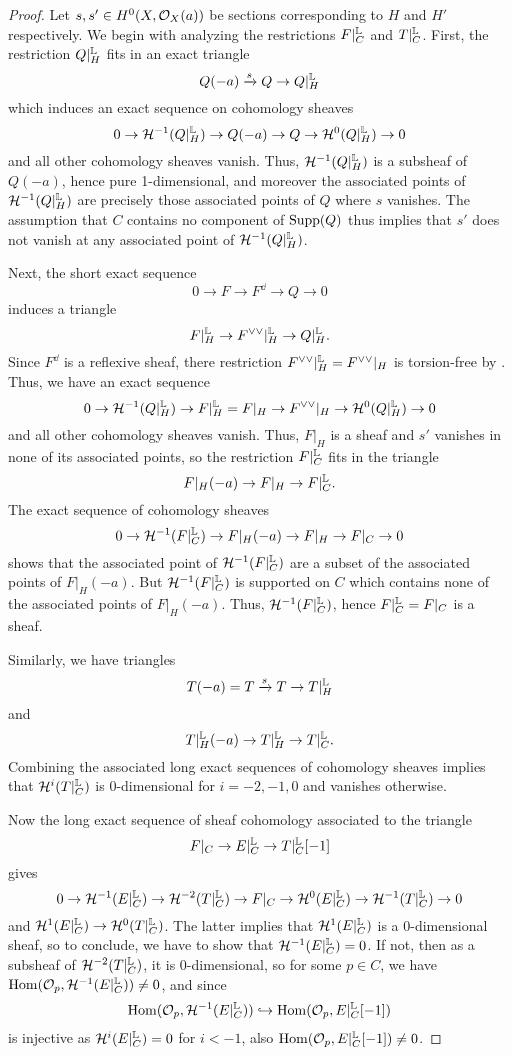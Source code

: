 \begin{proof}
Let $s, s' \in H^0(X, \mathcal{O}_X(a))$ be sections corresponding to $H$ and $H'$ respectively. We begin with analyzing the restrictions $F|^{\mathbb{L}}_C$ and $T|^{\mathbb{L}}_C$. First, the restriction $Q|^{\mathbb{L}}_H$ fits in an exact triangle
\[ Q(-a) \xrightarrow{s} Q \to Q|^{\mathbb{L}}_H \]
which induces an exact sequence on cohomology sheaves
\[ 0 \to \mathcal{H}^{-1}(Q|^{\mathbb{L}}_H) \to Q(-a) \to Q \to \mathcal{H}^0(Q|^{\mathbb{L}}_H) \to 0 \]
and all other cohomology sheaves vanish. Thus, $\mathcal{H}^{-1}(Q|^{\mathbb{L}}_H)$ is a subsheaf of $Q(-a)$, hence pure 1-dimensional, and moreover the associated points of $\mathcal{H}^{-1}(Q|^{\mathbb{L}}_H)$ are precisely those associated points of $Q$ where $s$ vanishes. The assumption that $C$ contains no component of $\operatorname{\mathrm{Supp}}(Q)$ thus implies that $s'$ does not vanish at any associated point of $\mathcal{H}^{-1}(Q|^{\mathbb{L}}_H)$.

Next, the short exact sequence
\[ 0 \to F \to F^\dd \to Q \to 0 \]
induces a triangle
\[ F|^{\mathbb{L}}_H \to F^{\vee\vee}|^{\mathbb{L}}_H \to Q|^{\mathbb{L}}_H. \]
Since $F^\dd$ is a reflexive sheaf, there restriction $F^{\vee\vee}|^{\mathbb{L}}_H = F^{\vee\vee}|_H$ is torsion-free by \cite[Corollary 1.1.14]{HL}. Thus, we have an exact sequence
\[ 0 \to \mathcal{H}^{-1}(Q|^{\mathbb{L}}_H) \to F|^{\mathbb{L}}_H = F|_H \to F^{\vee\vee}|_H \to \mathcal{H}^0(Q|^{\mathbb{L}}_H) \to 0 \]
and all other cohomology sheaves vanish. Thus, $F|_H$ is a sheaf and $s'$ vanishes in none of its associated points, so the restriction $F|^{\mathbb{L}}_C$ fits in the triangle
\[ F|_H(-a) \to F|_H \to F|^{\mathbb{L}}_C. \]
The exact sequence of cohomology sheaves
\[ 0 \to \mathcal{H}^{-1}(F|^{\mathbb{L}}_C) \to F|_H(-a) \to F|_H \to F|_C \to 0 \]
shows that the associated point of $\mathcal{H}^{-1}(F|^{\mathbb{L}}_C)$ are a subset of the associated points of $F|_H(-a)$. But $\mathcal{H}^{-1}(F|^{\mathbb{L}}_C)$ is supported on $C$ which contains none of the associated points of $F|_H(-a)$. Thus, $\mathcal{H}^{-1}(F|^{\mathbb{L}}_C)$, hence $F|^{\mathbb{L}}_C = F|_C$ is a sheaf.

Similarly, we have triangles
\[ T(-a) = T \xrightarrow{s} T \to T|^{\mathbb{L}}_H \]
and
\[ T|^{\mathbb{L}}_H(-a) \to T|^{\mathbb{L}}_H \to T|^{\mathbb{L}}_C. \]
Combining the associated long exact sequences of cohomology sheaves implies that $\mathcal{H}^i(T|^{\mathbb{L}}_C)$ is 0-dimensional for $i = -2, -1, 0$ and vanishes otherwise.

Now the long exact sequence of sheaf cohomology associated to the triangle
\[ F|_C \to E|^{\mathbb{L}}_C \to T|^{\mathbb{L}}_C[-1] \]
gives
\[ 0 \to \mathcal{H}^{-1}(E|^{\mathbb{L}}_C) \to \mathcal{H}^{-2}(T|^{\mathbb{L}}_C) \to F|_C \to \mathcal{H}^0(E|^{\mathbb{L}}_C) \to \mathcal{H}^{-1}(T|^{\mathbb{L}}_C) \to 0 \]
and $\mathcal{H}^1(E|^{\mathbb{L}}_C) \to \mathcal{H}^0(T|^{\mathbb{L}}_C)$. The latter implies that $\mathcal{H}^1(E|^{\mathbb{L}}_C)$ is a 0-dimensional sheaf, so to conclude, we have to show that $\mathcal{H}^{-1}(E|^{\mathbb{L}}_C) = 0$. If not, then as a subsheaf of $\mathcal{H}^{-2}(T|^{\mathbb{L}}_C)$, it is 0-dimensional, so for some $p \in C$, we have $\mathrm{Hom}(\mathcal{O}_p, \mathcal{H}^{-1}(E|^{\mathbb{L}}_C)) \neq 0$, and since
\[ \mathrm{Hom}(\mathcal{O}_p, \mathcal{H}^{-1}(E|^{\mathbb{L}}_C)) \hookrightarrow \mathrm{Hom}(\mathcal{O}_p, E|^{\mathbb{L}}_C[-1]) \] 
is injective as $\mathcal{H}^i(E|^{\mathbb{L}}_C) = 0$ for $i < -1$, also $\mathrm{Hom}(\mathcal{O}_p, E|^{\mathbb{L}}_C[-1]) \neq 0$.


\end{proof}
